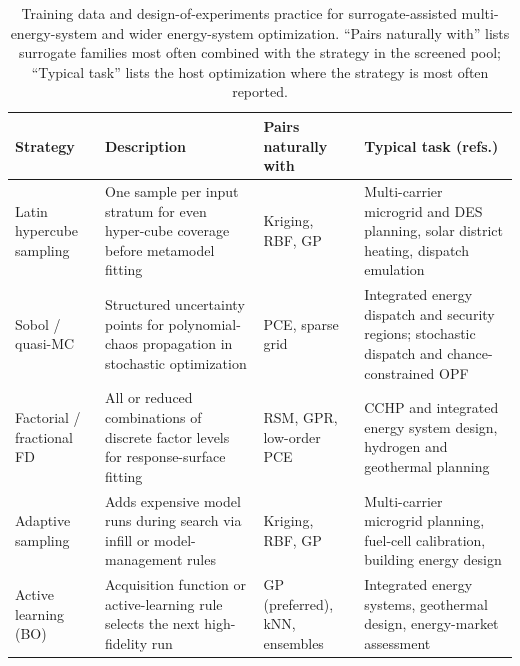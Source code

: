 \begin{table}[!t]
  \centering
  \footnotesize
  \caption{Training data and design-of-experiments practice for
  surrogate-assisted multi-energy-system and wider energy-system
  optimization. ``Pairs naturally with'' lists surrogate families most
  often combined with the strategy in the screened pool; ``Typical task''
  lists the host optimization where the strategy is most often reported.}
  \label{tab:T3-doe}
  \renewcommand{\arraystretch}{1.2}
  \begin{tabularx}{\textwidth}{@{}L{0.18\textwidth} L{0.30\textwidth} L{0.20\textwidth} L{0.26\textwidth}@{}}
    \toprule
    Strategy & Description & Pairs naturally with & Typical task (refs.) \\
    \midrule
    Latin hypercube sampling
      & One sample per input stratum for even hyper-cube coverage before metamodel fitting
      & Kriging, RBF, GP
      & Multi-carrier microgrid and DES planning, solar district heating, dispatch emulation
        \cite{Liu201914569,Seele20232480,Summ2025,Zhang2025__7,Hu2021671} \\
    Sobol / quasi-MC
      & Structured uncertainty points for polynomial-chaos propagation in stochastic optimization
      & PCE, sparse grid
      & Integrated energy dispatch and security regions; stochastic dispatch and chance-constrained OPF
        \cite{Dong2023,Jiang2026620,Gaitanis2026,Safta20172535,Lu201991827} \\
    Factorial / fractional FD
      & All or reduced combinations of discrete factor levels for response-surface fitting
      & RSM, GPR, low-order PCE
      & CCHP and integrated energy system design, hydrogen and geothermal planning
        \cite{Salahinezhad2025,Liu2025__4,Roy2023,Ahmad202451,Schulte2020} \\
    Adaptive sampling
      & Adds expensive model runs during search via infill or model-management rules
      & Kriging, RBF, GP
      & Multi-carrier microgrid planning, fuel-cell calibration, building energy design
        \cite{Liu201914569,Zhang2025__7,Aghaei Pour2022303,Granacher20221573,Lin2023} \\
    Active learning (BO)
      & Acquisition function or active-learning rule selects the next high-fidelity run
      & GP (preferred), kNN, ensembles
      & Integrated energy systems, geothermal design, energy-market assessment
        \cite{Griffith2025,Chen2025244,Chakrabarty2021,Uhrich2026211,Matta2026} \\

\end{tabularx}
\end{table}

